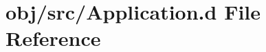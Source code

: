 \hypertarget{_application_8d}{}\section{obj/src/\+Application.d File Reference}
\label{_application_8d}
